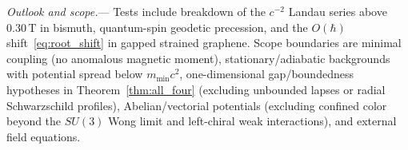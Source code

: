 \documentclass[aps,prl,reprint,superscriptaddress,nofootinbib,floatfix]{revtex4-2}
\theoremstyle{prlthm}
\newcommand{\prlsec}[1]{\par\smallskip\noindent\emph{#1.}---}
\begin{document}
\prlsec{Outlook and scope}
Tests include breakdown of the $c^{-2}$ Landau series above $0.30$\,T in bismuth, quantum-spin geodetic precession, and the $O(\hbar)$ shift~\eqref{eq:root_shift} in gapped strained graphene. Scope boundaries are minimal coupling (no anomalous magnetic moment), stationary/adiabatic backgrounds with potential spread below $m_{\min}c^2$, one-dimensional gap/boundedness hypotheses in Theorem~\ref{thm:all_four} (excluding unbounded lapses or radial Schwarzschild profiles), Abelian/vectorial potentials (excluding confined color beyond the $SU(3)$ Wong limit and left-chiral weak interactions), and external field equations.



\end{document}
